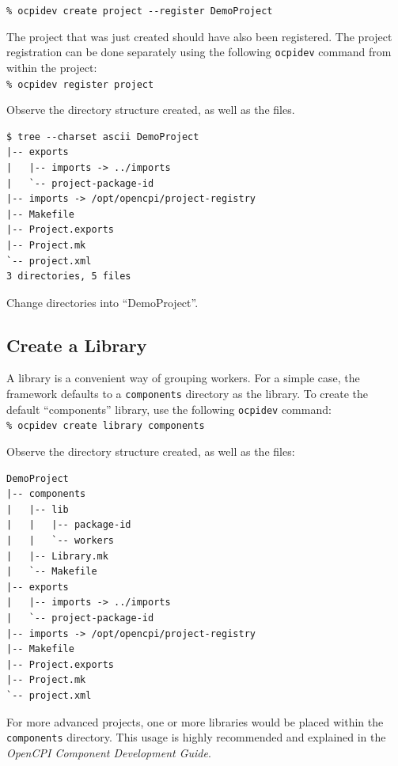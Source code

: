 \forceindent\verb+% ocpidev create project --register DemoProject+\\

The project that was just created should have also been registered.
The project registration can be done separately using the following \verb+ocpidev+ command from within the project:\\

\forceindent\forceindent\verb+% ocpidev register project+\\

Observe the directory structure created, as well as the files.\\

\bstart
\begin{verbatim}
$ tree --charset ascii DemoProject
|-- exports
|   |-- imports -> ../imports
|   `-- project-package-id
|-- imports -> /opt/opencpi/project-registry
|-- Makefile
|-- Project.exports
|-- Project.mk
`-- project.xml
3 directories, 5 files
\end{verbatim}
\bend
Change directories into ``DemoProject''.

\subsection{Create a Library}
A library is a convenient way of grouping workers. For a simple case, the framework defaults to a \verb+components+ directory as the library. To create the default ``components'' library, use the following \verb+ocpidev+ command:\\

\forceindent\verb+% ocpidev create library components+\\
\OcpidevCreate{}

\bstart
Observe the directory structure created, as well as the files:
\begin{verbatim}
DemoProject
|-- components
|   |-- lib
|   |   |-- package-id
|   |   `-- workers
|   |-- Library.mk
|   `-- Makefile
|-- exports
|   |-- imports -> ../imports
|   `-- project-package-id
|-- imports -> /opt/opencpi/project-registry
|-- Makefile
|-- Project.exports
|-- Project.mk
`-- project.xml

\end{verbatim}
\bend
For more advanced projects, one or more libraries would be placed within the \verb+components+ directory. This usage is highly recommended and explained in the \textit{OpenCPI Component Development Guide}.


